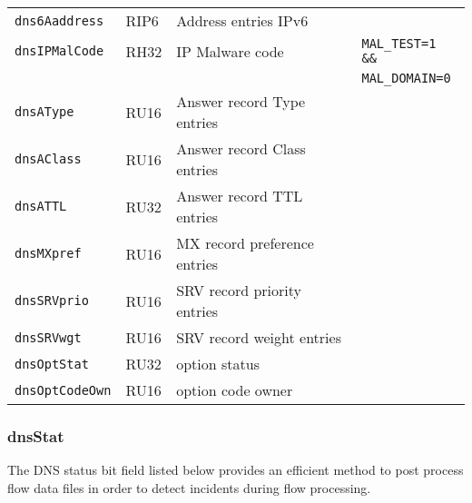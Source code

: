 \documentclass[documentation]{subfiles}
\begin{document}
\begin{longtable}{llll}
    {\tt dns6Aaddress} & RIP6 & Address entries IPv6 \\
    {\tt dnsIPMalCode} & RH32 & IP Malware code & {\tt MAL\_TEST=1 \&\&}\\
                       &      &                 & {\tt MAL\_DOMAIN=0}\\
    {\tt dnsAType}   & RU16 & Answer record Type entries \\
    {\tt dnsAClass}  & RU16 & Answer record Class entries \\
    {\tt dnsATTL}    & RU32 & Answer record TTL entries \\
    {\tt dnsMXpref}  & RU16 & MX record preference entries  \\
    {\tt dnsSRVprio} & RU16 & SRV record priority entries \\
    {\tt dnsSRVwgt}  & RU16 & SRV record weight entries\\
    {\tt dnsOptStat}  & RU32 & option status\\
    {\tt dnsOptCodeOwn}  & RU16 & option code owner\\
    \bottomrule
\end{longtable}

\subsubsection{dnsStat}\label{dnsStat}
The DNS status bit field listed below provides an efficient method to post process
flow data files in order to detect incidents during flow processing.
\end{document}
